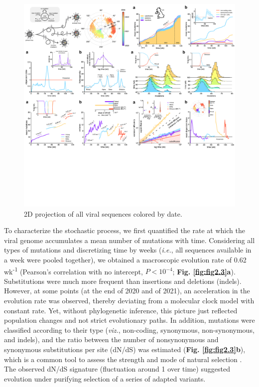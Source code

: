 \begin{figure}[ht!]
    \centering
    \includegraphics[trim={13.533cm 37.5cm 25.1cm 1cm},clip, width=0.5\linewidth]{assets/Ch2Fig.pdf}
    \caption{2D projection of all viral sequences colored by date.}\label{fig:fig2.2}
\end{figure}

To characterize the stochastic process, we first quantified the rate at which the viral genome accumulates a mean number of mutations with time. Considering all types of mutations and discretizing time by weeks (\textit{i.e.}, all sequences available in a week were pooled together), we obtained a macroscopic evolution rate of 0.62 wk\textsuperscript{-1} (Pearson's correlation with no intercept, $P < 10^{-4}$; \textbf{Fig. \ref{fig:fig2.3}a}). Substitutions were much more frequent than insertions and deletions (indels). However, at some points (at the end of 2020 and of 2021), an acceleration in the evolution rate was observed, thereby deviating from a molecular clock model with constant rate. Yet, without phylogenetic inference, this picture just reflected population changes and not strict evolutionary paths. In addition, mutations were classified according to their type (\textit{viz.}, non-coding, synonymous, non-synonymous, and indels), and the ratio between the number of nonsynonymous and synonymous substitutions per site (dN/dS) was estimated (\textbf{Fig. \ref{fig:fig2.3}b}), which is a common tool to assess the strength and mode of natural selection \cite{nielsen2005}. The observed dN/dS signature (fluctuation around 1 over time) suggested evolution under purifying selection of a series of adapted variants.

